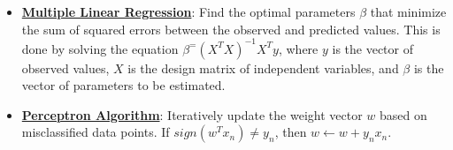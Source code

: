 \documentclass{article}%
\begin{document}
\begin{itemize}[leftmargin=*]%
\item \href{https://purdue.brightspace.com/d2l/common/assets/pdfjs-d2l-dist/1.0.14-legacy/web/viewer.html?file=\%2Fcontent\%2Fenforced\%2F1095467-wl.202510.CS.24300.001\%2F05L2-ML Basics.pdf\%3Fou\%3D1095467\&lang=en-us\&container=d2l-fileviewer-rendered-pdf\&fullscreen=d2l-fileviewer-rendered-pdf-dialog\&height=667#page=11}{\textbf{Multiple Linear Regression}}: Find the optimal parameters $\beta$ that minimize the sum of squared errors between the observed and predicted values. This is done by solving the equation $\beta^ = (X^TX)^{-1}X^Ty$, where $y$ is the vector of observed values, $X$ is the design matrix of independent variables, and $\beta$ is the vector of parameters to be estimated.%
\item \href{https://purdue.brightspace.com/d2l/common/assets/pdfjs-d2l-dist/1.0.14-legacy/web/viewer.html?file=\%2Fcontent\%2Fenforced\%2F1095467-wl.202510.CS.24300.001\%2F05L2-ML Basics.pdf\%3Fou\%3D1095467\&lang=en-us\&container=d2l-fileviewer-rendered-pdf\&fullscreen=d2l-fileviewer-rendered-pdf-dialog\&height=667#page=30}{\textbf{Perceptron Algorithm}}: Iteratively update the weight vector $w$ based on misclassified data points. If $sign(w^Tx_n) \ne y_n$, then $w \leftarrow w + y_nx_n$.%
\end{itemize}

%
\end{document}
